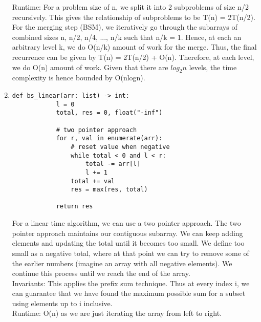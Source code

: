 \documentclass[12pt,letterpaper]{article}
\begin{document}
\begin{enumerate}
    Runtime: 
    For a problem size of n, we split it into 2 subproblems of size n/2 recursively. 
    This gives the relationship of subproblems to be T(n) = 2T(n/2).
    For the merging step (BSM), we iteratively go through the subarrays of combined sizes n, n/2, n/4, ..., n/k such that n/k = 1.
    Hence, at each an arbitrary level k, we do O(n/k) amount of work for the merge. 
    Thus, the final recurrence can be given by T(n) = 2T(n/2) + O(n). 
    Therefore, at each level, we do O(n) amount of work.
    Given that there are $log_2 n$ levels, the time complexity is hence bounded by O(nlogn).

    \item 
    \begin{lstlisting}[style = Python]
        def bs_linear(arr: list) -> int:
            l = 0
            total, res = 0, float("-inf")
        
            # two pointer approach
            for r, val in enumerate(arr):
                # reset value when negative
                while total < 0 and l < r:
                    total -= arr[l]
                    l += 1
                total += val
                res = max(res, total)
                
            return res
    \end{lstlisting}

    For a linear time algorithm, we can use a two pointer approach.
    The two pointer approach maintains our contiguous subarray.
    We can keep adding elements and updating the total until it becomes too small.
    We define too small as a negative total, 
    where at that point we can try to remove some of the earlier numbers 
    (imagine an array with all negative elements).
    We continue this process until we reach the end of the array. \\

    Invariants:
    This applies the prefix sum technique. 
    Thus at every index i, we can guarantee that we have found the maximum possible sum for a subset using elements up to i inclusive. \\

    Runtime:
    O(n) as we are just iterating the array from left to right.

\end{enumerate}
\end{document}
